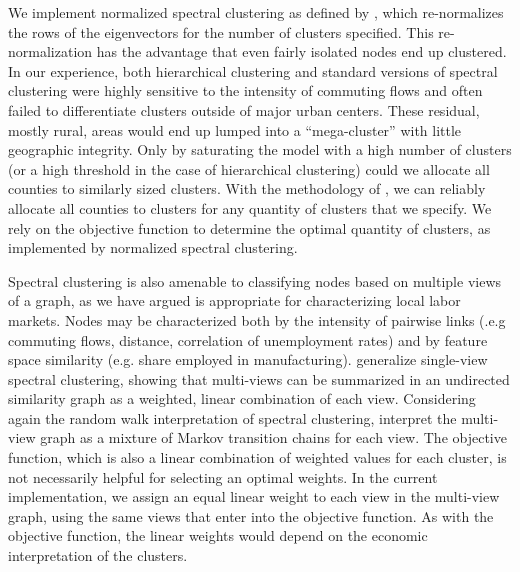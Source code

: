 We implement normalized spectral clustering as defined by \cite{NgJordanWeiss2001}, which re-normalizes the rows of the eigenvectors for the number of clusters specified. This re-normalization has the advantage that even fairly isolated nodes end up clustered. In our experience, both hierarchical clustering and standard versions of spectral clustering were highly sensitive to the intensity of commuting flows and often failed to differentiate clusters outside of major urban centers. These residual, mostly rural, areas would end up lumped into a ``mega-cluster'' with little geographic integrity. Only by saturating the model with a high number of clusters (or a high threshold in the case of hierarchical clustering) could we allocate all counties to similarly sized clusters. With the methodology of \cite{NgJordanWeiss2001}, we can reliably allocate all counties to clusters for any quantity of clusters that we specify. We rely on the objective function to determine the optimal quantity of clusters, as implemented by normalized spectral clustering.

Spectral clustering is also amenable to classifying nodes based on multiple views of a graph, as we have argued is appropriate for characterizing local labor markets. Nodes may be characterized both by the intensity of pairwise links (.e.g commuting flows, distance, correlation of unemployment rates) and by feature space similarity (e.g. share employed in manufacturing). \cite{ZhouBurges2007} generalize single-view spectral clustering, showing that multi-views can be summarized in an undirected similarity graph as a weighted, linear combination of each view. Considering again the random walk interpretation of spectral clustering, \cite{ZhouBurges2007} interpret the multi-view graph as a mixture of Markov transition chains for each view. The objective function, which is also a linear combination of weighted values for each cluster, is not necessarily helpful for selecting an optimal weights. In the current implementation, we assign an equal linear weight to each view in the multi-view graph, using the same views that enter into the objective function. As with the objective function, the linear weights would depend on the economic interpretation of the clusters. 

